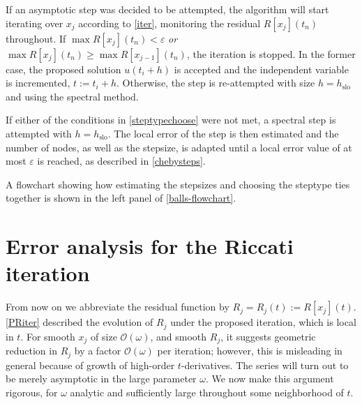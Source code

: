 \documentclass[10pt]{article}
\newcommand{\bigO}{{\mathcal O}}
\newcommand{\om}{\omega}
\begin{document}
If an asymptotic step was decided to be attempted, the algorithm will start
iterating over $x_j$ according to \cref{iter}, monitoring the residual
$R[x_j](t_n)$ throughout. If $\max R[x_j](t_n) < \varepsilon$ \emph{or} $\max
R[x_j](t_n) \geq \max R[x_{j-1}](t_n)$, the iteration is stopped. In the former
case, the proposed solution $u(t_i+h)$ is accepted and the independent variable
is incremented, $t := t_i + h$. Otherwise, the step is re-attempted with size
$h = h_{\text{slo}}$ and using the spectral method. 

If either of the conditions in \cref{steptypechoose} were not met, a spectral
step is attempted with $h = h_{\text{slo}}$. The local error of the step is
then estimated and the number of nodes, as well as the stepsize, is
adapted until a local error value of at most $\varepsilon$ is reached, as described in
\cref{chebysteps}.

A flowchart showing how estimating the stepsizes and choosing the steptype ties
together is shown in the left panel of \cref{balls-flowchart}.


\section{Error analysis for the Riccati iteration\label{errorana}}

From now on we abbreviate the residual function by $R_j = R_j(t) := R[x_j](t)$.
\cref{PRiter} described the evolution of $R_j$
under the proposed iteration, which is local in $t$.
For smooth $x_j$ of size $\bigO(\om)$, and smooth $R_j$,
it suggests geometric reduction in $R_j$ by a factor $\bigO(\om)$ per iteration;
however, this is misleading in general because of
growth of high-order $t$-derivatives.
The series will turn out to be merely asymptotic in the large parameter $\om$.
We now make this argument rigorous, for $\om$ analytic
and sufficiently large throughout some neighborhood of $t$.

\end{document}
